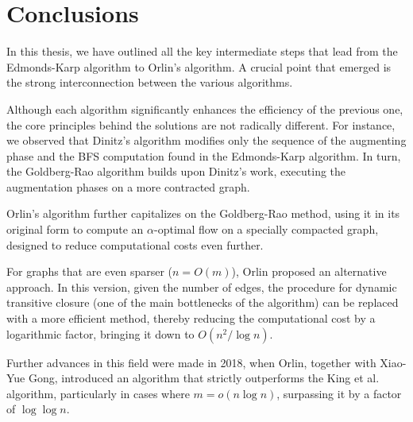 \chapter*{Conclusions}
In this thesis, we have outlined all the key intermediate steps that lead from the Edmonds-Karp algorithm to Orlin's algorithm. A crucial point that emerged is the strong interconnection between the various algorithms.

Although each algorithm significantly enhances the efficiency of the previous one, the core principles behind the solutions are not radically different. For instance, we observed that Dinitz’s algorithm modifies only the sequence of the augmenting phase and the BFS computation found in the Edmonds-Karp algorithm. In turn, the Goldberg-Rao algorithm builds upon Dinitz’s work, executing the augmentation phases on a more contracted graph.

Orlin’s algorithm further capitalizes on the Goldberg-Rao method, using it in its original form to compute an $\alpha$-optimal flow on a specially compacted graph, designed to reduce computational costs even further.

For graphs that are even sparser ($n = O(m)$), Orlin proposed an alternative approach. In this version, given the number of edges, the procedure for dynamic transitive closure (one of the main bottlenecks of the algorithm) can be replaced with a more efficient method, thereby reducing the computational cost by a logarithmic factor, bringing it down to $O(n^2/\log n)$.

Further advances in this field were made in 2018, when Orlin, together with Xiao-Yue Gong, introduced an algorithm\cite{orlin2019fastmaxflowalgorithm} that strictly outperforms the King et al. algorithm, particularly in cases where $m = o(n\log n)$, surpassing it by a factor of $\log\log n$.

